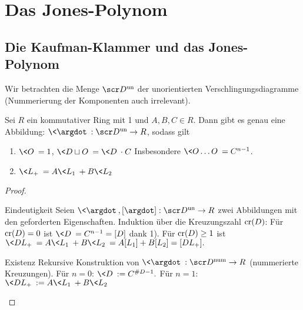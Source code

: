 \chapter{Das Jones-Polynom}


\section{Die Kaufman-Klammer und das Jones-Polynom}


Wir betrachten die Menge $\scr D^{\text{un}}$ der unorientierten Verschlingungsdiagramme (Nummerierung der Komponenten auch irrelevant).

\begin{prop}
    Sei $R$ ein kommutativer Ring mit 1 und $A, B, C \in R$.
    Dann gibt es genau eine Abbildung: $\<\argdot\> : \scr D^{\text{un}} \to R$, sodass gilt
    \begin{enumerate}[1)]
        \item
            $\<O\> = 1$, $\<D \sqcup O\> = \< D \> \cdot C$
            Insbesondere $\<O \dotso O\> = C^{n-1}$.
        \item
            $\<L_+\> = A \< L_1 \> + B \< L_2 \>$
    \end{enumerate}
    \begin{proof}
        \begin{seg}{Eindeutigkeit}
            Seien $\<\argdot\>, [\argdot]: \scr D^{\text{un}} \to R$ zwei Abbildungen mit den geforderten Eigenschaften.
            Induktion über die Kreuzungszahl $\operatorname{cr}(D)$:
            Für $\operatorname{cr}(D) = 0$ ist $\<D\> = C^{n-1} = [D]$ dank 1).
            Für $\operatorname{cr}(D) \ge 1$ ist
            \begin{math}
                \< D L_+ \>
                = A \< L_1 \> + B \< L_2 \>
                = A [ L_1 ] + B [ L_2 ]
                = [D L_+ ].
            \end{math}
        \end{seg}
        \begin{seg}{Existenz}
            Rekursive Konstruktion von $\<\argdot\>: \scr D^{\text{num}} \to R$ (nummerierte Kreuzungen).
            Für $n = 0$:
            \begin{math}
                \< D \> := C^{\#D - 1}.
            \end{math}
            Für $n = 1$:
            \begin{math}
                \< D L_+ \> := A \< L_1 \> + B \< L_2 \>
            \end{math}

\end{seg}
\end{proof}
\end{prop}
